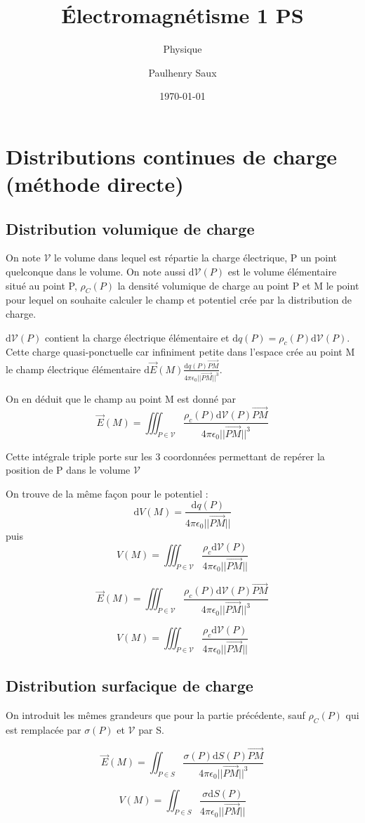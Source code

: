 \documentclass[french]{yLectureNote}
\title{Électromagnétisme 1 PS}
\subtitle{Physique}
\author{Paulhenry Saux}
\date{\today}
\renewcommand{\vec}{\overrightarrow}
\newcommand{\dd}{\mathrm{d}}
\newcommand{\norm}[1]{||\vec{#1}||}
\newcommand{\E}{\vec{E}(M)}
\newcommand{\V}{V(M)}
\newcommand{\mv}{\mathcal{V}}
\begin{document}
\setcounter{chapter}{3}
\chapter{Distributions continues de charge (méthode directe)}
\section{Distribution volumique de charge}
On note \(\mathcal{V}\) le volume dans lequel est répartie la charge électrique, P un point quelconque dans le volume. On note aussi \(\dd \mv (P)\) est le volume élémentaire situé au point P, \(\rho_C(P)\) la densité volumique de charge au point P et M le point pour lequel on souhaite calculer le champ et potentiel crée par la distribution de charge.

 \(\dd \mv (P)\) contient la charge électrique élémentaire et \(\dd q(P) = \rho_c(P)\dd \mv(P)\). Cette charge quasi-ponctuelle car infiniment petite dans l'espace crée au point M le champ électrique élémentaire \(\dd \E \frac{\dd q(P) \vec{PM}}{4\pi \epsilon_0 \norm{PM}^3}\).

 On en déduit que le champ au point M est donné par \[\E = \iiint_{P\in\mv} \frac{\rho_c(P)\dd \mv(P)\vec{PM}}{4\pi\epsilon_0 \norm{PM}^3}\]

 Cette intégrale triple porte sur les 3 coordonnées permettant de repérer la position de P dans le volume \(\mv\)

 On trouve de la m\^eme façon pour le potentiel :
 \[\dd \V = \frac{\dd q(P)}{4\pi\epsilon_0 \norm{PM}}\] puis \[V(M) = \iiint_{P\in \mv} \frac{\rho_c \dd \mv(P)}{4\pi\epsilon_0 \norm{PM}}\]
 \begin{theorem}
\[\E = \iiint_{P\in\mv} \frac{\rho_c(P)\dd \mv(P)\vec{PM}}{4\pi\epsilon_0 \norm{PM}^3}\]
 \end{theorem}
 \begin{theorem}
\[V(M) = \iiint_{P\in \mv} \frac{\rho_c \dd \mv(P)}{4\pi\epsilon_0 \norm{PM}}\]
 \end{theorem}
 \section{Distribution surfacique de charge}
On introduit les m\^emes grandeurs que pour la partie précédente, sauf  \(\rho_C(P)\) qui est remplacée par  \(\sigma(P)\) et \(\mv\) par S.

 \begin{theorem}
\[\E = \iint_{P\in S} \frac{\sigma(P)\dd S(P)\vec{PM}}{4\pi\epsilon_0 \norm{PM}^3}\]
 \end{theorem}
 \begin{theorem}
\[V(M) = \iint_{P\in S} \frac{\sigma \dd S(P)}{4\pi\epsilon_0 \norm{PM}}\]
 \end{theorem}
\end{document}
